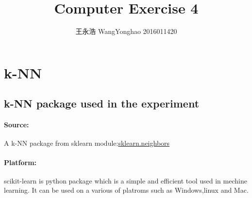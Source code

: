 \documentclass{article}
\title{Computer Exercise 4}
\date{}
\author{王永浩 WangYonghao 2016011420}
\begin{document}
	\maketitle
	\tableofcontents
	\newpage
	\renewcommand{\figurename}{Fig}
	\renewcommand{\captionlabeldelim}{.}
	
	\section{k-NN}
	\subsection{k-NN package used in the experiment}
	\paragraph{Source:}A k-NN package from sklearn module:\href{https://scikit-learn.org/stable/modules/classes.html#module-sklearn.neighbors}{sklearn.neighbors}
	\paragraph{Platform:} scikit-learn is python package which is a simple and efficient tool used in mechine learning. It can be used on a various of platroms such as Windows,linux and Mac.
\end{document}
